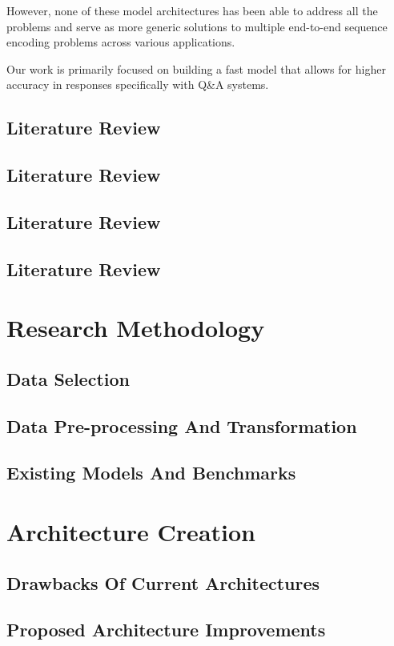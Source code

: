 \documentclass[12pt]{report}
\begin{document}
    However, none of these model architectures has been able to address all the problems and serve as more generic solutions to multiple end-to-end sequence encoding problems across various applications.

    Our work is primarily focused on building a fast model that allows for higher accuracy in responses specifically with Q\&A systems.
    \section{Literature Review}\label{c22}
    \section{Literature Review}\label{c23}
    \section{Literature Review}\label{c24}
    \section{Literature Review}\label{c25}
    \chapter{\centering Research Methodology}\label{c3}
    \section{Data Selection}\label{c31}
    \section{Data Pre-processing And Transformation}\label{c32}
    \section{Existing Models And Benchmarks}\label{c33}
    \chapter{\centering Architecture Creation}\label{c4}
    \section{Drawbacks Of Current Architectures}\label{c41}
    \section{Proposed Architecture Improvements}\label{c42}
\end{document}
